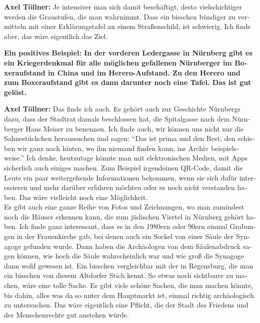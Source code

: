 \begin{otherlanguage}{ngerman}
\textbf{Axel Töllner:} Je intensiver man sich damit beschäftigt, desto vielschichtiger werden die Graustufen, die man wahrnimmt. Dass ein bisschen bündiger zu vermitteln mit einer Erklärungstafel an einem Straßenschild, ist schwierig. Ich finde aber, das wäre eigentlich das Ziel. 

\textbf{Ein positives Beispiel: In der vorderen Ledergasse in Nürnberg gibt es ein Kriegerdenkmal für alle möglichen gefallenen Nürnberger im Boxeraufstand in China und im Herero-Aufstand. Zu den Herero und zum Boxeraufstand gibt es dann darunter noch eine Tafel. Das ist gut gelöst.} 

\textbf{Axel Töllner:} Das finde ich auch. Es gehört auch zur Geschichte Nürnbergs dazu, dass der Stadtrat damals beschlossen hat, die Spitalgasse nach dem Nürnberger Hans Meiser zu benennen. Ich finde auch, wir können uns nicht nur die Sahnestückchen heraussuchen und sagen: "`Das ist prima und den Rest, den schieben wir ganz nach hinten, wo ihn niemand finden kann, ins Archiv beispielsweise."' Ich denke, heutzutage könnte man mit elektronischen Medien, mit Apps sicherlich auch einiges machen. Zum Beispiel irgendeinen QR-Code, damit die Leute ein paar weitergehende Informationen bekommen, wenn sie sich dafür interessieren und mehr darüber erfahren möchten oder es noch nicht verstanden haben. Das wäre vielleicht noch eine Möglichkeit. \\
Es gibt auch eine ganze Reihe von Fotos und Zeichnungen, wo man zumindest noch die Häuser erkennen kann, die zum jüdischen Viertel in Nürnberg gehört haben. Ich finde ganz interessant, dass es in den 1980ern oder 90ern einmal Grabungen in der Frauenkirche gab, bei denen auch ein Sockel von einer Säule der Synagoge gefunden wurde. Dann haben die Archäologen von dem Säulenabdruck sagen können, wie hoch die Säule wahrscheinlich war und wie groß die Synagoge dann wohl gewesen ist. Ein bisschen vergleichbar mit der in Regensburg, die man ein bisschen von diesem Altdorfer Stich kennt. So etwas noch sichtbarer zu machen, wäre eine tolle Sache. Es gibt viele schöne Sachen, die man machen könnte, bis dahin, alles was da so unter dem Hauptmarkt ist, einmal richtig archäologisch zu untersuchen. Das wäre eigentlich eine Pflicht, die der Stadt des Friedens und der Menschenrechte gut anstehen würde. 
\end{otherlanguage}